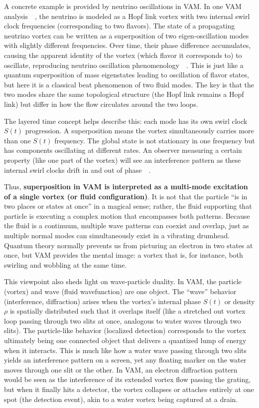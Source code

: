 \documentclass[preprint]{revtex4-2}
\begin{document}
    A concrete example is provided by neutrino oscillations in VAM. In one VAM analysis~\cite{reference_96}~\cite{reference_97}, the neutrino is modeled as a Hopf link vortex with two internal swirl clock frequencies (corresponding to two flavors). The state of a propagating neutrino vortex can be written as a superposition of two eigen-oscillation modes with slightly different frequencies. Over time, their phase difference accumulates, causing the apparent identity of the vortex (which flavor it corresponds to) to oscillate, reproducing neutrino oscillation phenomenology~\cite{reference_98}~\cite{reference_99}. This is just like a quantum superposition of mass eigenstates leading to oscillation of flavor states, but here it is a classical beat phenomenon of two fluid modes. The key is that the two modes share the same topological structure (the Hopf link remains a Hopf link) but differ in how the flow circulates around the two loops.

    The layered time concept helps describe this: each mode has its own swirl clock $S(t)$ progression. A superposition means the vortex simultaneously carries more than one $S(t)$ frequency. The global state is not stationary in one frequency but has components oscillating at different rates. An observer measuring a certain property (like one part of the vortex) will see an interference pattern as these internal swirl clocks drift in and out of phase~\cite{reference_100}~\cite{reference_101}.

    Thus, \textbf{superposition in VAM is interpreted as a multi-mode excitation of a single vortex (or fluid configuration)}. It is not that the particle “is in two places or states at once” in a magical sense; rather, the fluid supporting that particle is executing a complex motion that encompasses both patterns. Because the fluid is a continuum, multiple wave patterns can coexist and overlap, just as multiple normal modes can simultaneously exist in a vibrating drumhead. Quantum theory normally prevents us from picturing an electron in two states at once, but VAM provides the mental image: a vortex that is, for instance, both swirling and wobbling at the same time.

    This viewpoint also sheds light on wave-particle duality. In VAM, the particle (vortex) and wave (fluid wavefunction) are one object. The “wave” behavior (interference, diffraction) arises when the vortex’s internal phase $S(t)$ or density $\rho$ is spatially distributed such that it overlaps itself (like a stretched out vortex loop passing through two slits at once, analogous to water waves through two slits). The particle-like behavior (localized detection) corresponds to the vortex ultimately being one connected object that delivers a quantized lump of energy when it interacts. This is much like how a water wave passing through two slits yields an interference pattern on a screen, yet any floating marker on the water moves through one slit or the other. In VAM, an electron diffraction pattern would be seen as the interference of its extended vortex flow passing the grating, but when it finally hits a detector, the vortex collapses or attaches entirely at one spot (the detection event), akin to a water vortex being captured at a drain.
\end{document}
